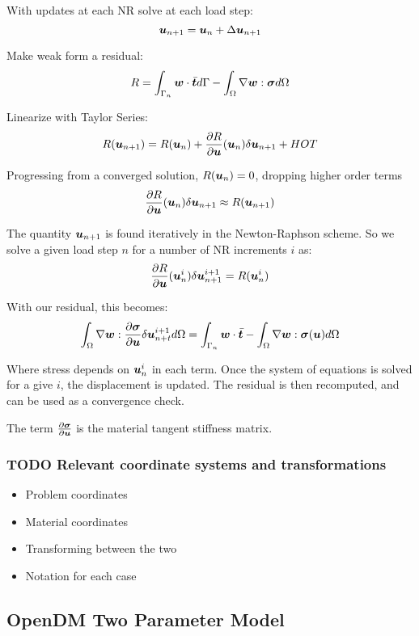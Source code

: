 \documentclass[11pt]{article}
\begin{document}
With updates at each NR solve at each load step:
\[
\bm{u}_{n+1} = \bm{u}_n + \Delta \bm{u}_{n+1}
\]

Make weak form a residual:
\[
R = 
\int_{\Gamma_n} \bm{w} \cdot \bar{\bm{t}} d\Gamma -
\int_{\Omega} \nabla \bm{w} : \bm{\sigma} d\Omega
\]

Linearize with Taylor Series:
\[
R (\bm{u}_{n+1}) = R (\bm{u}_{n}) +
\frac{\partial R}{\partial \bm{u}} (\bm{u}_{n})
\delta \bm{u}_{n+1} +
HOT
\]

Progressing from a converged solution, \(R(\bm{u}_n) = 0\), dropping
higher order terms
\[
\frac{\partial R}{\partial \bm{u}}(\bm{u}_n) \delta \bm{u}_{n+1} \approx 
R (\bm{u}_{n+1})
\]

The quantity \(\bm{u}_{n+1}\) is found iteratively in the Newton-Raphson
scheme. So we solve a given load step \(n\) for a number of NR
increments \(i\) as:
\[
\frac{\partial R}{\partial \bm{u}} (\bm{u}_n^i) \delta \bm{u}_{n+1}^{i+1} =
R (\bm{u}_{n}^{i})
\]

With our residual, this becomes:
\[
\int_{\Omega} \nabla \bm{w} : \frac{\partial \bm{\sigma}}{\partial \bm{u}}
\delta \bm{u}_{n+t}^{i+1} d\Omega =
\int_{\Gamma_n} \bm{w} \cdot \bar{\bm{t}} -
\int_{\Omega} \nabla \bm{w} : \bm{\sigma} (\bm{u}) d\Omega 
\]

Where stress depends on \(\bm{u}_{n}^{i}\) in each term. Once the system
of equations is solved for a give \(i\), the displacement is updated. The
residual is then recomputed, and can be used as a convergence check.

The term \(\frac{\partial \bm{\sigma}}{\partial \bm{u}}\) is the material
tangent stiffness matrix.
\subsubsection{{\bfseries\sffamily TODO} Relevant coordinate systems and transformations}
\label{sec:org98c4a7f}
\begin{itemize}
\item Problem coordinates
\item Material coordinates
\item Transforming between the two
\item Notation for each case
\end{itemize}
\subsection{OpenDM Two Parameter Model}
\label{sec:orgc376f26}
\end{document}
